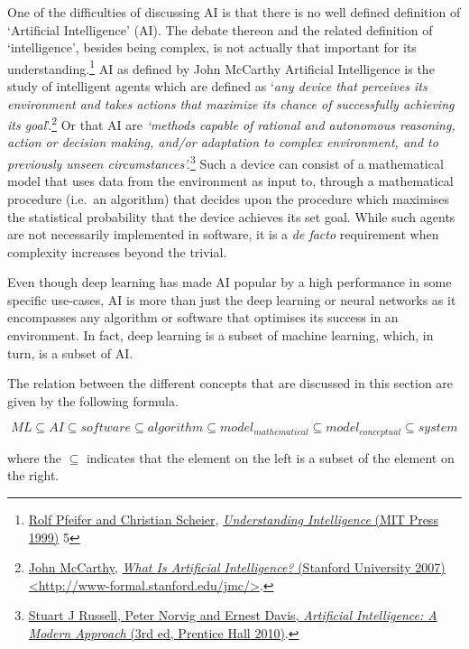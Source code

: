 \documentclass[
]{scrartcl}
\begin{document}
One of the difficulties of discussing AI is that there is no well defined definition of `Artificial Intelligence' (AI). The debate thereon and the related definition of `intelligence', besides being complex, is not actually that important for its understanding.\footnote{\protect\hyperlink{ref-pfeiferUnderstandingIntelligence1999a}{Rolf Pfeifer and Christian Scheier}, \protect\hyperlink{ref-pfeiferUnderstandingIntelligence1999a}{\emph{Understanding Intelligence} ({MIT Press} 1999)} 5} AI as defined by John McCarthy Artificial Intelligence is the study of intelligent agents which are defined as `\emph{any device that perceives its environment and takes actions that maximize its chance of successfully achieving its goal}'.\footnote{\protect\hyperlink{ref-mccarthyWhatArtificialIntelligence2007b}{John McCarthy}, \protect\hyperlink{ref-mccarthyWhatArtificialIntelligence2007b}{\emph{What {Is Artificial Intelligence}?} ({Stanford University} 2007) \textless{}\url{http://www-formal.stanford.edu/jmc/}\textgreater{}}.} Or that AI are \emph{`methods capable of rational and autonomous reasoning, action or decision making, and/or adaptation to complex environment, and to previously unseen circumstances'.}\footnote{\protect\hyperlink{ref-russellArtificialIntelligenceModern2010c}{Stuart J Russell, Peter Norvig and Ernest Davis, \emph{Artificial {Intelligence}: {A Modern Approach}} (3rd ed, {Prentice Hall} 2010)}.} Such a device can consist of a mathematical model that uses data from the environment as input to, through a mathematical procedure (i.e.~an algorithm) that decides upon the procedure which maximises the statistical probability that the device achieves its set goal. While such agents are not necessarily implemented in software, it is a \emph{de facto} requirement when complexity increases beyond the trivial.

Even though deep learning has made AI popular by a high performance in some specific use-cases, AI is more than just the deep learning or neural networks as it encompasses any algorithm or software that optimises its success in an environment. In fact, deep learning is a subset of machine learning, which, in turn, is a subset of AI.

The relation between the different concepts that are discussed in this section are given by the following formula.

\[ML\subseteq AI\subseteq software\subseteq algorithm\subseteq model_{mathematical}\subseteq model_{conceptual}\subseteq system\]

where the \(\subseteq\) indicates that the element on the left is a subset of the element on the right.
\end{document}
